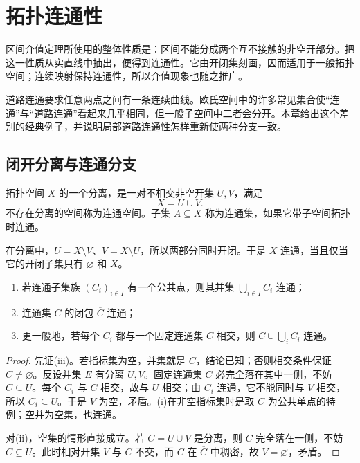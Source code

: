 \chapter{拓扑连通性}
\label{chap:topological-connectedness}

区间介值定理所使用的整体性质是：区间不能分成两个互不接触的非空开部分。把这一性质从实直线中抽出，便得到连通性。它由开闭集刻画，因而适用于一般拓扑空间；连续映射保持连通性，所以介值现象也随之推广。

道路连通要求任意两点之间有一条连续曲线。欧氏空间中的许多常见集合使“连通”与“道路连通”看起来几乎相同，但一般子空间中二者会分开。本章给出这个差别的经典例子，并说明局部道路连通性怎样重新使两种分支一致。

\section{闭开分离与连通分支}

\begin{definition}[分离与连通]
拓扑空间 \(X\) 的一个分离，是一对不相交非空开集 \(U,V\)，满足
\[
 X=U\cup V.
\]
不存在分离的空间称为连通空间。子集 \(A\subseteq X\) 称为连通集，如果它带子空间拓扑时连通。
\end{definition}

在分离中，\(U=X\setminus V\)、\(V=X\setminus U\)，所以两部分同时开闭。于是 \(X\) 连通，当且仅当它的开闭子集只有 \(\varnothing\) 和 \(X\)。

\begin{theorem}[连通集的粘合与闭包]
\label{thm:connected-union-closure}
\begin{enumerate}[label=\textup{(\roman*)}]
 \item 若连通子集族 \((C_i)_{i\in I}\) 有一个公共点，则其并集
 \(\bigcup_{i\in I}C_i\) 连通；
 \item 连通集 \(C\) 的闭包 \(\overline C\) 连通；
 \item 更一般地，若每个 \(C_i\) 都与一个固定连通集 \(C\) 相交，则
 \(C\cup\bigcup_iC_i\) 连通。
\end{enumerate}
\end{theorem}

\begin{proof}
先证(iii)。若指标集为空，并集就是 \(C\)，结论已知；否则相交条件保证
\(C\ne\varnothing\)。反设并集 \(E\) 有分离 \(U,V\)。固定连通集 \(C\) 必完全落在其中一侧，不妨 \(C\subseteq U\)。每个 \(C_i\) 与 \(C\) 相交，故与 \(U\) 相交；由 \(C_i\) 连通，它不能同时与 \(V\) 相交，所以 \(C_i\subseteq U\)。于是 \(V\) 为空，矛盾。(i)在非空指标集时是取 \(C\) 为公共单点的特例；空并为空集，也连通。

对(ii)，空集的情形直接成立。若 \(\overline C=U\cup V\) 是分离，则
\(C\) 完全落在一侧，不妨 \(C\subseteq U\)。此时相对开集 \(V\) 与
\(C\) 不交，而 \(C\) 在 \(\overline C\) 中稠密，故 \(V=\varnothing\)，矛盾。
\end{proof}

